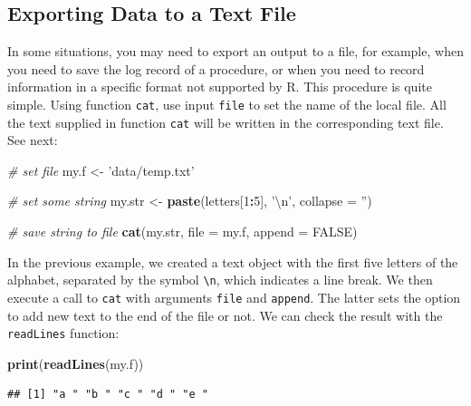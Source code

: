 \documentclass[11pt,]{book}
\newenvironment{Shaded}{\begin{snugshade}}{\end{snugshade}}
\newcommand{\KeywordTok}[1]{\textcolor[rgb]{0.27,0.27,0.27}{\textbf{#1}}}
\newcommand{\DataTypeTok}[1]{\textcolor[rgb]{0.27,0.27,0.27}{#1}}
\newcommand{\DecValTok}[1]{\textcolor[rgb]{0.06,0.06,0.06}{#1}}
\newcommand{\CharTok}[1]{\textcolor[rgb]{0.5,0.5,0.5}{#1}}
\newcommand{\StringTok}[1]{\textcolor[rgb]{0.5,0.5,0.5}{#1}}
\newcommand{\CommentTok}[1]{\textcolor[rgb]{0.56,0.35,0.01}{\textit{#1}}}
\newcommand{\OtherTok}[1]{\textcolor[rgb]{0.56,0.35,0.01}{#1}}
\newcommand{\OperatorTok}[1]{\textcolor[rgb]{0.81,0.36,0.00}{\textbf{#1}}}
\newcommand{\NormalTok}[1]{#1}
\begin{document}
\subsection{Exporting Data to a Text
File}\label{exporting-data-to-a-text-file}

In some situations, you may need to export an output to a file, for
example, when you need to save the log record of a procedure, or when
you need to record information in a specific format not supported by R.
This procedure is quite simple. Using function \texttt{cat}, use input
\texttt{file} to set the name of the local file. All the text supplied
in function \texttt{cat} will be written in the corresponding text file.
See next: 

\begin{Shaded}
\begin{Highlighting}[]
\CommentTok{# set file}
\NormalTok{my.f <-}\StringTok{ 'data/temp.txt'}

\CommentTok{# set some string}
\NormalTok{my.str <-}\StringTok{ }\KeywordTok{paste}\NormalTok{(letters[}\DecValTok{1}\OperatorTok{:}\DecValTok{5}\NormalTok{], }\StringTok{'}\CharTok{\textbackslash{}n}\StringTok{'}\NormalTok{, }\DataTypeTok{collapse =} \StringTok{''}\NormalTok{)}

\CommentTok{# save string to file}
\KeywordTok{cat}\NormalTok{(my.str, }\DataTypeTok{file =}\NormalTok{ my.f, }\DataTypeTok{append =} \OtherTok{FALSE}\NormalTok{)}
\end{Highlighting}
\end{Shaded}

In the previous example, we created a text object with the first five
letters of the alphabet, separated by the symbol
\texttt{\textbackslash{}n}, which indicates a line break. We then
execute a call to \texttt{cat} with arguments \texttt{file} and
\texttt{append}. The latter sets the option to add new text to the end
of the file or not. We can check the result with the \texttt{readLines}
function:

\begin{Shaded}
\begin{Highlighting}[]
\KeywordTok{print}\NormalTok{(}\KeywordTok{readLines}\NormalTok{(my.f))}
\end{Highlighting}
\end{Shaded}

\begin{verbatim}
## [1] "a " "b " "c " "d " "e "
\end{verbatim}
\end{document}
